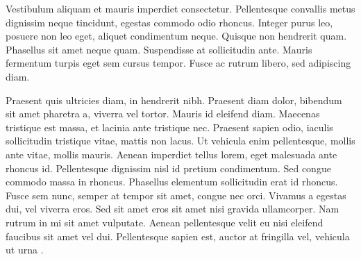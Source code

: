 Vestibulum aliquam et mauris imperdiet consectetur. Pellentesque convallis
metus dignissim neque tincidunt, egestas commodo odio rhoncus. Integer
purus leo, posuere non leo eget, aliquet condimentum neque. Quisque
non hendrerit quam. Phasellus sit amet neque quam. Suspendisse at
sollicitudin ante. Mauris fermentum turpis eget sem cursus tempor.
Fusce ac rutrum libero, sed adipiscing diam.

Praesent quis ultricies diam, in hendrerit nibh. Praesent diam dolor,
bibendum sit amet pharetra a, viverra vel tortor. Mauris id eleifend
diam. Maecenas tristique est massa, et lacinia ante tristique nec.
Praesent sapien odio, iaculis sollicitudin tristique vitae, mattis
non lacus. Ut vehicula enim pellentesque, mollis ante vitae, mollis
mauris. Aenean imperdiet tellus lorem, eget malesuada ante rhoncus
id. Pellentesque dignissim nisl id pretium condimentum. Sed congue
commodo massa in rhoncus. Phasellus elementum sollicitudin erat id
rhoncus. Fusce sem nunc, semper at tempor sit amet, congue nec orci.
Vivamus a egestas dui, vel viverra eros. Sed sit amet eros sit amet
nisi gravida ullamcorper. Nam rutrum in mi sit amet vulputate. Aenean
pellentesque velit eu nisi eleifend faucibus sit amet vel dui. Pellentesque
sapien est, auctor at fringilla vel, vehicula ut urna \cite{Dijkstra68Letters}.
